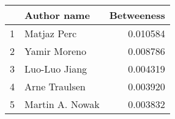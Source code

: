 \begin{tabular}{llr}
\toprule
{} &      Author name &  Betweeness \\
\midrule
1 &      Matjaz Perc &    0.010584 \\
2 &     Yamir Moreno &    0.008786 \\
3 &    Luo-Luo Jiang &    0.004319 \\
4 &    Arne Traulsen &    0.003920 \\
5 &  Martin A. Nowak &    0.003832 \\
\bottomrule
\end{tabular}
